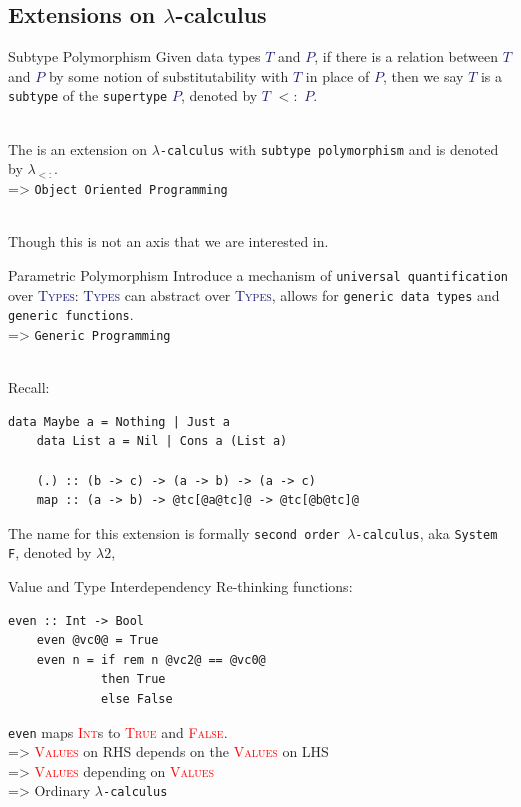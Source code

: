 \documentclass[xcolor={usenames,dvipsnames}]{beamer}
\newcommand{\htycon}[1]{\textcolor{MidnightBlue}{\textsc{#1}}}
\newcommand{\hvalcon}[1]{\textcolor{Red}{\textsc{#1}}}
\begin{document}
\subsection{Extensions on $\lambda$-calculus}

\begin{frame}[fragile]{Subtype Polymorphism}
  Given data types \htycon{$T$} and \htycon{$P$}, if there is a relation between \htycon{$T$} and \htycon{$P$} by some notion of substitutability with \htycon{$T$} in place of \htycon{$P$}, then we say \htycon{$T$} is a \texttt{subtype} of the \texttt{supertype} \htycon{$P$}, denoted by \htycon{$T$} $<:$ \htycon{$P$}.

  \ \\
  The is an extension on \texttt{$\lambda$-calculus} with \texttt{subtype polymorphism} and is denoted by $\lambda_{<:}$.\\
  => \texttt{Object Oriented Programming}
  
  \ \\
  \scriptsize{Though this is not an axis that we are interested in}.
\end{frame}

\begin{frame}[fragile]{Parametric Polymorphism}
  Introduce a mechanism of \texttt{universal quantification} over \htycon{Types}: \htycon{Types} can abstract over \htycon{Types}, allows for \texttt{generic data types} and \texttt{generic functions}.\\
  => \texttt{Generic Programming}

  \ \\
  Recall:
  \begin{lstlisting}[style=hask]
    data Maybe a = Nothing | Just a
    data List a = Nil | Cons a (List a)

    (.) :: (b -> c) -> (a -> b) -> (a -> c)
    map :: (a -> b) -> @tc[@a@tc]@ -> @tc[@b@tc]@
  \end{lstlisting}

  The name for this extension is formally \texttt{second order $\lambda$-calculus}, aka \texttt{System F}, denoted by $\lambda2$,
\end{frame}

\begin{frame}[fragile]{Value and Type Interdependency}
  Re-thinking functions:
  \begin{lstlisting}[style=hask]
    even :: Int -> Bool
    even @vc0@ = True
    even n = if rem n @vc2@ == @vc0@
             then True
             else False
  \end{lstlisting}

  \qquad \texttt{even} maps \hvalcon{Int}s to \hvalcon{True} and \hvalcon{False}.
  \ \\
  => \hvalcon{Values} on RHS depends on the \hvalcon{Values} on LHS
  \ \\
  => \hvalcon{Values} depending on \hvalcon{Values}
  \ \\
  => Ordinary \texttt{$\lambda$-calculus}
\end{frame}
\end{document}
